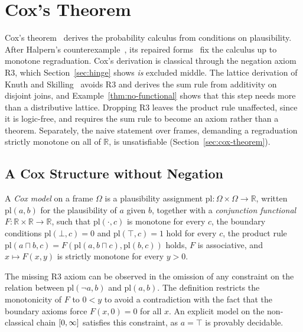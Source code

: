 \section{Cox's Theorem}
\label{sec:cox}

Cox's theorem~\cite{cox1946,jaynes2003} derives the probability
calculus from conditions on plausibility.  After Halpern's
counterexample~\cite{halpern1999}, its repaired
forms~\cite{vanhorn2003,arnborg-sjodin2000} fix the calculus up to
monotone regraduation.  Cox's derivation is classical through the
negation axiom R3, which Section~\ref{sec:hinge} shows \emph{is}
excluded middle. The lattice derivation of Knuth and
Skilling~\cite{knuth-skilling2012} avoids R3 and derives the sum rule from
additivity on disjoint joins, and Example~\ref{thm:no-functional} shows
that this step needs more than a distributive lattice.  Dropping R3 leaves the product rule
unaffected, since it is logic-free, and requires the sum rule to become an axiom
rather than a theorem.  Separately, the naive statement over frames,
demanding a regraduation strictly monotone on all of $\mathbb{R}$, is
unsatisfiable (Section~\ref{sec:cox-theorem}).

\subsection{A Cox Structure without Negation}

\begin{definition}
\label{def:coxmodel}
A \emph{Cox model} on a frame $\Omega$ is a plausibility assignment
$\mathrm{pl} : \Omega \times \Omega \to \mathbb{R}$, written
$\mathrm{pl}(a, b)$ for the plausibility of $a$ given $b$, together with
a \emph{conjunction functional} $F : \mathbb{R} \times \mathbb{R} \to
\mathbb{R}$, such that $\mathrm{pl}(\cdot, c)$ is monotone for every $c$,
the boundary conditions $\mathrm{pl}(\bot, c) = 0$ and
$\mathrm{pl}(\top, c) = 1$ hold for every $c$, the product rule
$\mathrm{pl}(a \sqcap b, c) = F(\mathrm{pl}(a, b \sqcap c),
\mathrm{pl}(b, c))$ holds, $F$ is associative, and $x \mapsto F(x, y)$ is
strictly monotone for every $y > 0$.
\end{definition}

The missing R3 axiom can be observed in the omission of
any constraint on the relation between
$\mathrm{pl}(\neg a, b)$ and $\mathrm{pl}(a, b)$.
The definition restricts the monotonicity of $F$ to
$0 < y$ to avoid a contradiction with the fact that
the boundary axioms force $F(x, 0) = 0$ for all
$x$.  An explicit model on the
non-classical chain $[0,\infty]$ satisfies
this constraint, as $a = \top$ is provably decidable.


